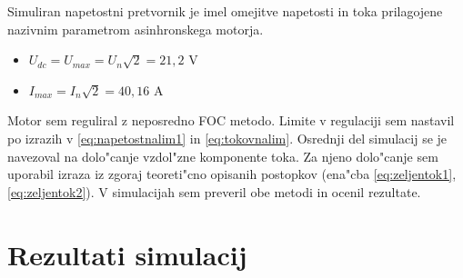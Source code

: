 \documentclass[journal,a4paper,twoside]{sty/IEEEtran}
\begin{document}
Simuliran napetostni pretvornik je imel omejitve napetosti in toka prilagojene nazivnim parametrom asinhronskega motorja.
\begin{itemize}
\item{$U_{dc}=U_{max}=U_n\sqrt{2}=21,2$ V}
\item{$I_{max}=I_n\sqrt{2}=40,16$ A}
\end{itemize}



Motor sem reguliral z neposredno FOC metodo. Limite v regulaciji sem nastavil po izrazih v \ref{eq:napetostnalim1} in \ref{eq:tokovnalim}.
Osrednji del simulacij se je navezoval na dolo"canje vzdol"zne komponente toka. Za njeno dolo"canje sem uporabil izraza iz zgoraj teoreti"cno opisanih postopkov (ena"cba \ref{eq:zeljentok1},\ref{eq:zeljentok2}). V simulacijah sem preveril obe metodi in ocenil rezultate.

\section{Rezultati simulacij}



%
%
%
%
%
%
\end{document}

